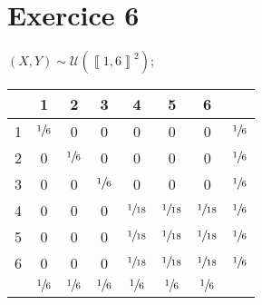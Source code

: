 \part{Exercice 6}

$(X,Y) \sim \mathcal{U}\left( \left\llbracket 1,6 \right\rrbracket^2 \right)$;

\begin{center}
	\begin{tabular}{c|cccccc|c}
		\diagbox{$z$}{$x$}&1&2&3&4&5&6&\\ \hline
		1&$\sfrac{1}{6}$&0&0&0&0&0&$\sfrac{1}{6}$\\
		2&0&$\sfrac{1}{6}$&0&0&0&0&$\sfrac{1}{6}$\\
		3&0&0&$\sfrac{1}{6}$&0&0&0&$\sfrac{1}{6}$\\
		4&0&0&0&$\sfrac{1}{18}$&$\sfrac{1}{18}$&$\sfrac{1}{18}$&$\sfrac{1}{6}$\\
		5&0&0&0&$\sfrac{1}{18}$&$\sfrac{1}{18}$&$\sfrac{1}{18}$&$\sfrac{1}{6}$\\
		6&0&0&0&$\sfrac{1}{18}$&$\sfrac{1}{18}$&$\sfrac{1}{18}$&$\sfrac{1}{6}$\\\hline
		&$\sfrac{1}{6}$&$\sfrac{1}{6}$&$\sfrac{1}{6}$&$\sfrac{1}{6}$&$\sfrac{1}{6}$&$\sfrac{1}{6}$
	\end{tabular}
\end{center}

